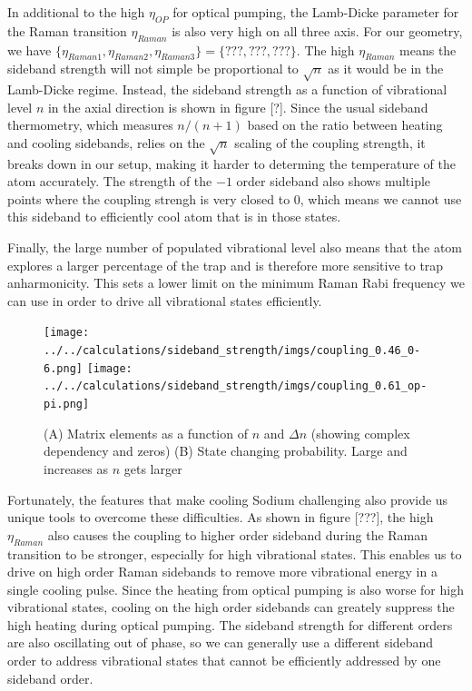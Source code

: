 \documentclass[aps,twocolumn,secnumarabic,balancelastpage,amsmath,amssymb,nofootinbib]{revtex4}
\begin{document}
In additional to the high $\eta_{OP}$ for optical pumping, the Lamb-Dicke parameter for the Raman
transition $\eta_{Raman}$ is also very high on all three axis. For our geometry, we have $\{\eta_{Raman1},\eta_{Raman2},\eta_{Raman3}\} = \{???, ???, ???\}$.
The high $\eta_{Raman}$ means the sideband strength will not simple be proportional to $\sqrt{n}$ as it would be in the Lamb-Dicke regime. Instead, the sideband strength as a function of vibrational level $n$ in the axial direction is shown in figure [?].
Since the usual sideband thermometry, which measures $n/(n + 1)$ based on the ratio between heating and cooling sidebands, relies on the $\sqrt{n}$ scaling of the coupling strength, it breaks down
in our setup, making it harder to determing the temperature of the atom accurately. The strength
of the $-1$ order sideband also shows multiple points where the coupling strengh is very closed to
$0$, which means we cannot use this sideband to efficiently cool atom that is in those states.

Finally, the large number of populated vibrational level also means that the atom explores a larger percentage of the trap and is therefore more sensitive to trap anharmonicity.
This sets a lower limit on the minimum Raman Rabi frequency we can use in order to drive all
vibrational states efficiently.


\begin{figure}
  \texttt{[image: ../../calculations/sideband\_strength/imgs/coupling\_0.46\_0-6.png]}
  \texttt{[image: ../../calculations/sideband\_strength/imgs/coupling\_0.61\_op-pi.png]}
  \caption{(A) Matrix elements as a function of $n$ and $\Delta n$ (showing complex dependency and zeros) (B) State changing probability. Large and increases as $n$ gets larger}
  \label{f-ld}
\end{figure}

Fortunately, the features that make cooling Sodium challenging also provide us unique tools to
overcome these difficulties. As shown in figure [???], the high $\eta_{Raman}$ also causes the
coupling to higher order sideband during the Raman transition to be stronger,
especially for high vibrational states. This enables us to drive on high order Raman sidebands
to remove more vibrational energy in a single cooling pulse.
Since the heating from optical pumping is also worse for high vibrational states,
cooling on the high order sidebands can greately suppress the high heating during optical pumping.
The sideband strength for different orders are also oscillating out of phase, so we can generally
use a different sideband order to address vibrational states that cannot be efficiently addressed
by one sideband order.
\end{document}
